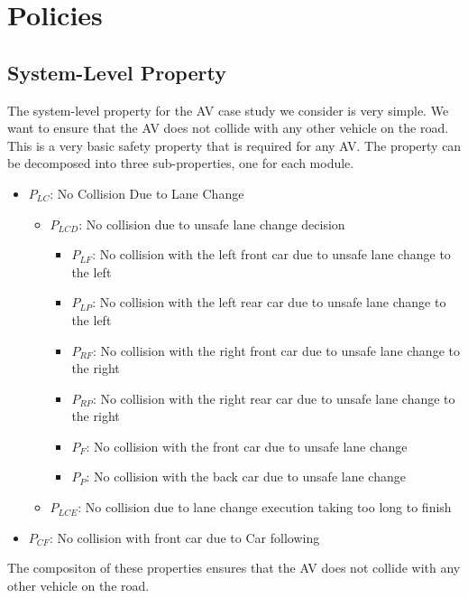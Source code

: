\section{Policies}
\label{sec:av_policies}


\subsection{System-Level Property}

The system-level property for the AV case study we consider is very simple. We want to ensure that the AV does not collide with any other vehicle on the road. This is a very basic safety property that is required for any AV. The property can be decomposed into three sub-properties, one for each module. 

\begin{itemize}
  \item $P_{LC}$: No Collision Due to Lane Change
  \begin{itemize}
      \item $P_{LCD}$: No collision due to unsafe lane change decision
      \begin{itemize}
        \item $P_{LF}$: No collision with the left front car due to unsafe lane change to the left
        \item  $P_{LP}$: No collision with the left rear car due to unsafe lane change to the left
        \item $P_{RF}$: No collision with the right front car due to unsafe lane change to the right
        \item $P_{RP}$: No collision with the right rear car due to unsafe lane change to the right
        \item $P_{F}$: No collision with the front car due to unsafe lane change
        \item $P_{P}$: No collision with the back car due to unsafe lane change
      \end{itemize}
      \item $P_{LCE}$: No collision due to lane change execution taking too long to finish
  \end{itemize}
  \item $P_{CF}$: No collision with front car due to Car following 
\end{itemize}

The compositon of these properties ensures that the AV does not collide with any other vehicle on the road.

